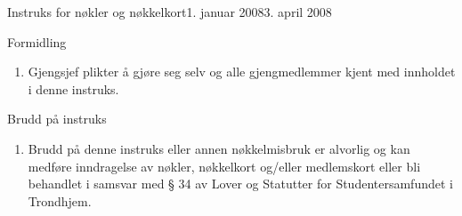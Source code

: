\begin{instruks}{Instruks for nøkler og nøkkelkort}{1. januar 2008}{3. april 2008}
    \begin{instruksledd}{Formidling}
        \begin{enumerate}
            \item Gjengsjef plikter å gjøre seg selv og alle gjengmedlemmer kjent med innholdet i
                denne instruks.
        \end{enumerate}
    \end{instruksledd}

    \begin{instruksledd}{Brudd på instruks}
        \begin{enumerate}
            \item Brudd på denne instruks eller annen nøkkelmisbruk er alvorlig og kan medføre
                inndragelse av nøkler, nøkkelkort
                og/eller medlemskort eller bli behandlet i samsvar med § 34 av Lover og Statutter
                for Studentersamfundet i
                Trondhjem.
        \end{enumerate}
    \end{instruksledd}

\end{instruks}


